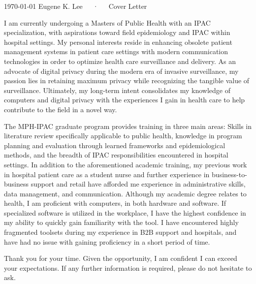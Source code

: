 \documentclass[11pt, a4paper]{awesome-cv}
\begin{document}
\makecvheader[R]

\makecvfooter
  {\today}
  {Eugene K. Lee~~~·~~~Cover Letter}
  {}

\makelettertitle

\begin{cvletter}

I am currently undergoing a Masters of Public Health with an IPAC specialization, with aspirations toward field epidemiology and IPAC within hospital settings. My personal interests reside in enhancing obsolete patient management systems in patient care settings with modern communication technologies in order to optimize health care surveillance and delivery. As an advocate of digital privacy during the modern era of invasive surveillance, my passion lies in retaining maximum privacy while recognizing the tangible value of surveillance. Ultimately, my long-term intent consolidates my knowledge of computers and digital privacy with the experiences I gain in health care to help contribute to the field in a novel way.


The MPH-IPAC graduate program provides training in three main areas: Skills in literature review specifically applicable to public health, knowledge in program planning and evaluation through learned frameworks and epidemiological methods, and the breadth of IPAC responsibilities encountered in hospital settings. In addition to the aforementioned academic training, my previous work in hospital patient care as a student nurse and further experience in business-to-business support and retail have afforded me experience in administrative skills, data management, and communication. Although my academic degree relates to health, I am proficient with computers, in both hardware and software. If specialized software is utilized in the workplace, I have the highest confidence in my ability to quickly gain familiarity with the tool. I have encountered highly fragmented toolsets during my experience in B2B support and hospitals, and have had no issue with gaining proficiency in a short period of time.

Thank you for your time. Given the opportunity, I am confident I can exceed your expectations. If any further information is required, please do not hesitate to ask.

\end{cvletter}


\makeletterclosing
\end{document}

